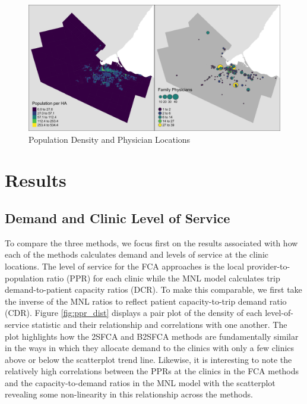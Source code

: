 \documentclass[]{elsarticle} %
\begin{document}
\begin{figure}
\includegraphics[width=1\linewidth]{./img/study_area_map} \caption{\label{fig:study_area_map}Population Density and Physician Locations}\label{fig:plot study_area_map}
\end{figure}

\hypertarget{results}{%
\section{Results}\label{results}}

\hypertarget{demand-and-clinic-level-of-service}{%
\subsection{Demand and Clinic Level of
Service}\label{demand-and-clinic-level-of-service}}

To compare the three methods, we focus first on the results associated
with how each of the methods calculates demand and levels of service at
the clinic locations. The level of service for the FCA approaches is the
local provider-to-population ratio (PPR) for each clinic while the MNL
model calculates trip demand-to-patient capacity ratios (DCR). To make
this comparable, we first take the inverse of the MNL ratios to reflect
patient capacity-to-trip demand ratio (CDR). Figure \ref{fig:ppr_dist}
displays a pair plot of the density of each level-of-service statistic
and their relationship and correlations with one another. The plot
highlights how the 2SFCA and B2SFCA methods are fundamentally similar in
the ways in which they allocate demand to the clinics with only a few
clinics above or below the scatterplot trend line. Likewise, it is
interesting to note the relatively high correlations between the PPRs at
the clinics in the FCA methods and the capacity-to-demand ratios in the
MNL model with the scatterplot revealing some non-linearity in this
relationship across the methods.
\end{document}
